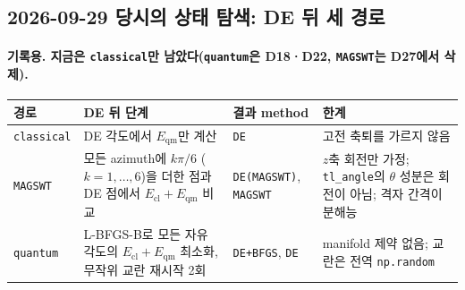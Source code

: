 \subsection{2026-09-29 당시의 상태 탐색: DE 뒤 세 경로}\label{state-search-current}
\begingroup%
  \framesubtitle{기록용. 지금은 \texttt{classical}만 남았다(\texttt{quantum}은 D18·D22, \texttt{MAGSWT}는 D27에서 삭제).}
  \small
  \begin{tabularx}{\textwidth}{@{}p{1.7cm}YP{2.2cm}Y@{}}
    \toprule
    경로 & DE 뒤 단계 & 결과 method & 한계 \\
    \midrule
    \texttt{classical} & DE 각도에서 $E_{\mathrm{qm}}$만 계산 & \texttt{DE}
      & 고전 축퇴를 가르지 않음 \\
    \texttt{MAGSWT} & 모든 azimuth에 $k\pi/6$ ($k=1,\dots,6$)을 더한 점과 DE 점에서 $E_{\mathrm{cl}}+E_{\mathrm{qm}}$ 비교
      & \texttt{DE(MAGSWT)}, \texttt{MAGSWT}
      & $z$축 회전만 가정; \texttt{tl\_angle}의 $\theta$ 성분은 회전이 아님; 격자 간격이 분해능 \\
    \texttt{quantum} & L-BFGS-B로 모든 자유 각도의 $E_{\mathrm{cl}}+E_{\mathrm{qm}}$ 최소화, 무작위 교란 재시작 2회
      & \texttt{DE+BFGS}, \texttt{DE}
      & manifold 제약 없음; 교란은 전역 \texttt{np.random} \\
    \bottomrule
  \end{tabularx}
  \par\medskip
\endgroup


